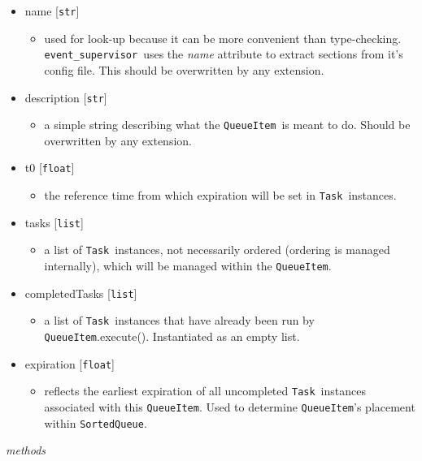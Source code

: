 \documentclass{article}
\newcommand{\SortedQueue}{\texttt{SortedQueue}}
\newcommand{\QueueItem}{\texttt{QueueItem}}
\newcommand{\Task}{\texttt{Task}}
\newcommand{\eventSupervisor}{\texttt{event\_supervisor}}
\newcommand{\pythonfloat}{\texttt{float}}
\newcommand{\pythonstr}{\texttt{str}}
\newcommand{\pythonlist}{\texttt{list}}
\begin{document}
\begin{itemize}
    \item{name [\pythonstr]
        \begin{itemize}
            \item{used for look-up because it can be more convenient than type-checking. \eventSupervisor~uses the \textit{name} attribute to extract sections from it's config file. This should be overwritten by any extension.}
        \end{itemize}
         }
    \item{description [\pythonstr]
        \begin{itemize}
            \item{a simple string describing what the \QueueItem~is meant to do. Should be overwritten by any extension.}
        \end{itemize}
         }
    \item{t0 [\pythonfloat]
        \begin{itemize}
            \item{the reference time from which expiration will be set in \Task~instances.}
        \end{itemize}
         }
    \item{tasks [\pythonlist]
        \begin{itemize}
            \item{a list of \Task~instances, not necessarily ordered (ordering is managed internally), which will be managed within the \QueueItem.}
        \end{itemize}
         }
    \item{completedTasks [\pythonlist]
        \begin{itemize}
            \item{a list of \Task~instances that have already been run by \QueueItem.execute(). Instantiated as an empty list.}
        \end{itemize}
         }
    \item{expiration [\pythonfloat]
        \begin{itemize}
            \item{reflects the earliest expiration of all uncompleted \Task~instances associated with this \QueueItem. Used to determine \QueueItem's placement within \SortedQueue.}
        \end{itemize}
         }
\end{itemize}

\noindent
\textit{methods}
\end{document}
